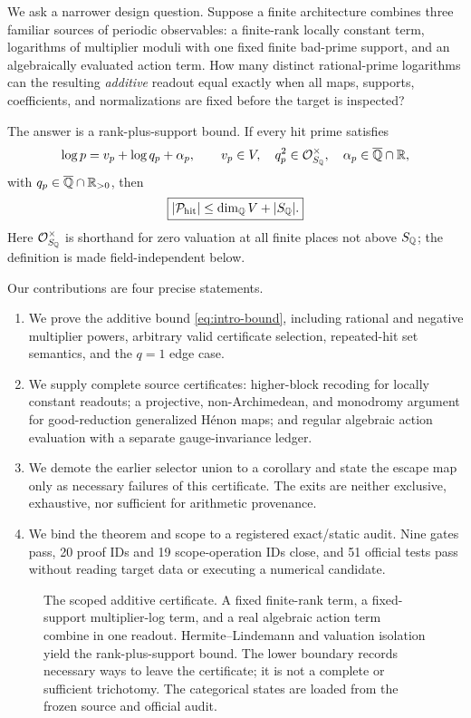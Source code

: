 \documentclass[11pt]{article}
\theoremstyle{definition}
\theoremstyle{remark}
\begin{document}
We ask a narrower design question.  Suppose a finite architecture combines
three familiar sources of periodic observables: a finite-rank locally constant
term, logarithms of multiplier moduli with one fixed finite bad-prime support,
and an algebraically evaluated action term.  How many distinct rational-prime
logarithms can the resulting \emph{additive} readout equal exactly when all
maps, supports, coefficients, and normalizations are fixed before the target
is inspected?

The answer is a rank-plus-support bound.  If every hit prime satisfies
\begin{equation}
 \log p=v_p+\log q_p+\alpha_p,
 \qquad v_p\in V,\quad q_p^2\in\mathcal O_{S_{\mathbb Q}}^{\times},
 \quad \alpha_p\in\overline{\mathbb Q}\cap\mathbb R,
 \label{eq:intro-normal-form}
\end{equation}
with $q_p\in\overline{\mathbb Q}\cap\mathbb R_{>0}$, then
\begin{equation}
 \boxed{|\mathcal P_{\mathrm{hit}}|\leq\dim_{\mathbb Q} V+|S_{\mathbb Q}|.}
 \label{eq:intro-bound}
\end{equation}
Here $\mathcal O_{S_{\mathbb Q}}^{\times}$ is shorthand for zero valuation at all finite
places not above $S_{\mathbb Q}$; the definition is made field-independent below.

Our contributions are four precise statements.
\begin{enumerate}
  \item We prove the additive bound \eqref{eq:intro-bound}, including
  rational and negative multiplier powers, arbitrary valid certificate
  selection, repeated-hit set semantics, and the $q=1$ edge case.
  \item We supply complete source certificates: higher-block recoding for
  locally constant readouts; a projective, non-Archimedean, and monodromy
  argument for good-reduction generalized H\'enon maps; and regular algebraic
  action evaluation with a separate gauge-invariance ledger.
  \item We demote the earlier selector union to a corollary and state the
  escape map only as necessary failures of this certificate.  The exits are
  neither exclusive, exhaustive, nor sufficient for arithmetic provenance.
  \item We bind the theorem and scope to a registered exact/static audit.
  Nine gates pass, 20 proof IDs and 19 scope-operation IDs close, and 51
  official tests pass without reading target data or executing a numerical
  candidate.
\end{enumerate}

\begin{figure}[t]
  \centering
  \AdditiveCapacityFigure
  \caption{The scoped additive certificate.  A fixed finite-rank term, a
  fixed-support multiplier-log term, and a real algebraic action term combine
  in one readout.  Hermite--Lindemann and valuation isolation yield the
  rank-plus-support bound.  The lower boundary records necessary ways to leave
  the certificate; it is not a complete or sufficient trichotomy.  The
  categorical states are loaded from the frozen source and official audit.}
  \label{fig:additive-capacity}
\end{figure}
\end{document}
